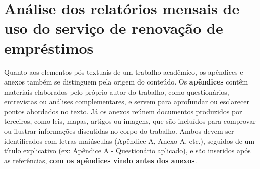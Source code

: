 {\let\clearpage\relax \chapter{\textbf{Análise dos
relatórios mensais de uso do serviço de renovação de empréstimos}}}

Quanto aos elementos pós-textuais de um trabalho acadêmico, os apêndices e anexos também se distinguem pela origem do conteúdo. Os \textbf{apêndices} contêm materiais elaborados pelo próprio autor do trabalho, como questionários, entrevistas ou análises complementares, e servem para aprofundar ou esclarecer pontos abordados no texto. Já os anexos reúnem documentos produzidos por terceiros, como leis, mapas, artigos ou imagens, que são incluídos para comprovar ou ilustrar informações discutidas no corpo do trabalho. Ambos devem ser identificados com letras maiúsculas (Apêndice A, Anexo A, etc.), seguidos de um título explicativo (ex: Apêndice A - Questionário aplicado), 
 e são inseridos após as referências, \textbf{com os apêndices vindo antes dos anexos}.\\